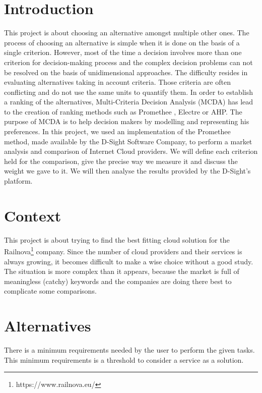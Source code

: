 \documentclass[a4paper,11pt]{article}
\begin{document}
\section{Introduction}
This project is about choosing an alternative amongst multiple other ones. The process of choosing an alternative is simple when it is done on the basis of a single criterion. However, most of the time a decision involves more than one criterion for decision-making process and the complex decision problems can not be resolved on the basis of unidimensional approaches. The difficulty resides in evaluating alternatives taking in account criteria. Those criteria are often conflicting and do not use the same units to quantify them. In order to establish a ranking of the alternatives, Multi-Criteria Decision Analysis (MCDA) has lead to the creation of ranking methods such as Promethee , Electre or AHP. The purpose of MCDA is to help decision makers by modelling and representing his preferences. In this project, we used an implementation of the Promethee method, made available by the D-Sight Software Company, to perform a market analysis and comparison of Internet \og Cloud \fg{} providers. We will define each criterion held for the comparison, give the precise way we measure it and discuss the weight we gave to it. We will then analyse the results provided by the D-Sight's platform.\\ %


\section{Context}
This project is about trying to find the best fitting cloud solution for the Railnova\footnote{https://www.railnova.eu/} company. Since the number of cloud providers and their services is always growing, it becomes difficult to make a wise choice without a good study. The situation is more complex than it appears, because the market is full of meaningless (catchy) keywords and the companies are doing there best to complicate some comparisons.


\section{Alternatives}
There is a minimum requirements needed by the user to perform the given tasks. This minimum requirements is a threshold to consider a service as a solution.\\
\end{document}

